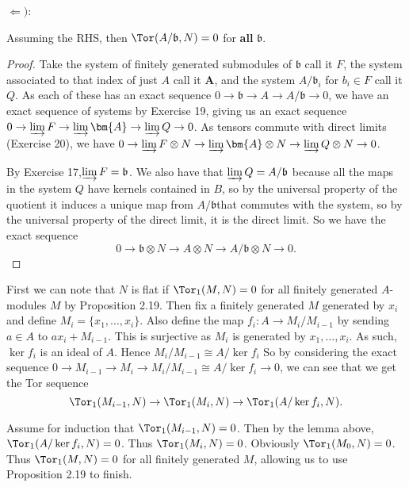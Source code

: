 \begin{questions}
\begin{solution}
		$\Leftarrow)$:
		\begin{lem}
			Assuming the RHS, then $\Tor(A / \mathfrak{b},N) = 0$ for \textbf{all} $\mathfrak{b}$.
		\end{lem}
		\begin{proof}
			Take the system of finitely generated submodules of $\mathfrak{b}$ call it $F $, the system associated to that index of just $A$ call it $\bm{A} $, and the system $A / \mathfrak{b}_i$ for $b_i \in F$ call it $Q$.
			As each of these has an exact sequence $0\to\mathfrak{b} \to A \to A / \mathfrak{b}\to 0$, we have an exact sequence of systems by Exercise 19, giving us an exact sequence $0\to \varinjlim F \to \varinjlim \bm{A} \to \varinjlim Q \to 0$.
			As tensors commute with direct limits (Exercise 20), we have $0\to \varinjlim F \otimes N \to \varinjlim \bm{A} \otimes N \to \varinjlim Q \otimes N \to 0$.

			By Exercise 17,$\varinjlim F = \mathfrak{b}$.
			We also have that $\varinjlim Q = A / \mathfrak{b}$ because all the maps in the system $Q$ have kernels contained in $B $, so by the universal property of the quotient it induces a unique map from $A / \mathfrak{b} $that commutes with the system, so by the universal property of the direct limit, it is the direct limit.
			So we have the exact sequence
			\[
				0 \to \mathfrak{b} \otimes N \to A \otimes N \to A / \mathfrak{b} \otimes N\to 0
			.\]
		\end{proof}

		First we can note that $N$ is flat if $\Tor_1(M,N) = 0$ for all finitely generated $A$-modules $M$ by Proposition 2.19.
		Then fix a finitely generated $M$ generated by $x_i$ and define $M_i = \{x_{1},\ldots, x_i\}$.
		Also define the map $f_i: A \to M_i / M_{i-1}$ by sending $a \in A$ to $ax_i + M_{i-1}$.
		This is surjective as $M_i$ is generated by $x_{1}, \ldots , x_i$.
		As such,$\ker f_i$ is an ideal of $A$.
		Hence $M_i / M_{i-1} \cong A / \ker f_i $
		So by considering the exact sequence $0 \to M_{i-1} \to M_{i}\to M_i / M_{i-1} \cong A / \ker f_i \to 0$, we can see that we get the Tor sequence
		\[
			\Tor_1(M_{i-1},N) \to \Tor_1(M_i,N) \to \Tor_1(A / \ker f_i, N)
		.\]

		Assume for induction that $\Tor_1(M_{i-1},N) = 0$.
		Then by the lemma above,$\Tor_1(A / \ker f_i,N) = 0$.
		Thus $\Tor_{1}(M_i,N) = 0$.
		Obviously $\Tor_{1}(M_{0},N) = 0$.
		Thus $\Tor_{1}(M,N) = 0$ for all finitely generated $M $, allowing us to use Proposition 2.19 to finish.
	\end{solution}


\end{questions}
